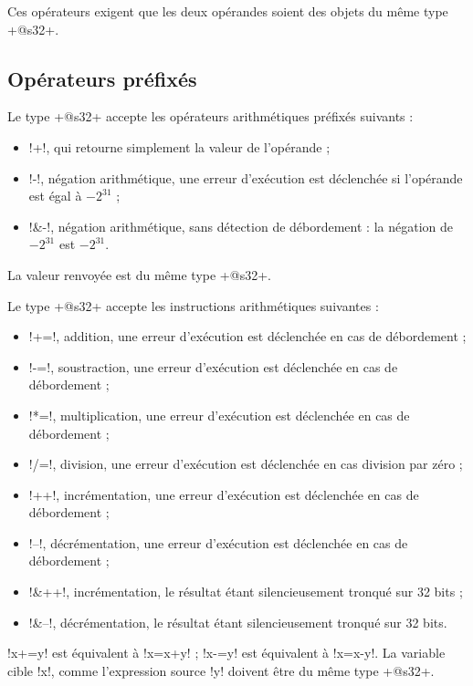 Ces opérateurs exigent que les deux opérandes soient des objets du même type \ggsq+@s32+.

\subsection{Opérateurs préfixés}
Le type \ggsq+@s32+ accepte les opérateurs arithmétiques préfixés suivants :
\begin{itemize}
  \item \ggsq!+!, qui retourne simplement la valeur de l'opérande ;
  \item \ggsq!-!, négation arithmétique, une erreur d'exécution est déclenchée si l'opérande est égal à $-2^{31}$ ;
  \item \ggsq!&-!, négation arithmétique, sans détection de débordement : la négation de $-2^{31}$ est $-2^{31}$.
\end{itemize}

La valeur renvoyée est du même type  \ggsq+@s32+.



Le type \ggsq+@s32+ accepte les instructions arithmétiques suivantes :
\begin{itemize}
  \item \ggsq!+=!, addition, une erreur d'exécution est déclenchée en cas de débordement ;
  \item \ggsq!-=!, soustraction, une erreur d'exécution est déclenchée en cas de débordement ;
  \item \ggsq!*=!, multiplication, une erreur d'exécution est déclenchée en cas de débordement ;
  \item \ggsq!/=!, division, une erreur d'exécution est déclenchée en cas division par zéro ;
  \item \ggsq!++!, incrémentation, une erreur d'exécution est déclenchée en cas de débordement ;
  \item \ggsq!--!, décrémentation, une erreur d'exécution est déclenchée en cas de débordement ;
  \item \ggsq!&++!, incrémentation, le résultat étant silencieusement tronqué sur 32 bits ;
  \item \ggsq!&--!, décrémentation, le résultat étant silencieusement tronqué sur 32 bits.
\end{itemize}

\ggsq!x+=y! est équivalent à \ggsq!x=x+y! ; \ggsq!x-=y! est équivalent à \ggsq!x=x-y!.
La variable cible \ggsq!x!, comme l'expression source \ggsq!y! doivent être du même type \ggsq+@s32+.

